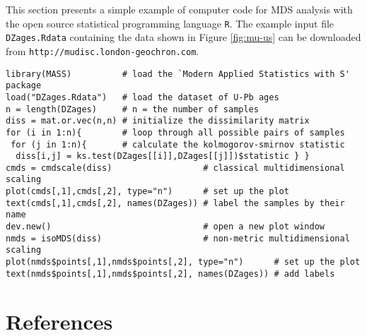 \documentclass[authoryear,preprint,review,12pt]{elsarticle}
\begin{document}
This section presents a simple example of computer code for MDS
analysis with the open source statistical programming language
\texttt{R}. The example input file \texttt{DZages.Rdata} containing
the data shown in Figure \ref{fig:mu-us} can be downloaded from
\texttt{http://mudisc.london-geochron.com}.

\begin{verbatim}
library(MASS)          # load the `Modern Applied Statistics with S' package
load("DZages.Rdata")   # load the dataset of U-Pb ages
n = length(DZages)     # n = the number of samples
diss = mat.or.vec(n,n) # initialize the dissimilarity matrix
for (i in 1:n){        # loop through all possible pairs of samples
 for (j in 1:n){       # calculate the kolmogorov-smirnov statistic
  diss[i,j] = ks.test(DZages[[i]],DZages[[j]])$statistic } }
cmds = cmdscale(diss)                  # classical multidimensional scaling
plot(cmds[,1],cmds[,2], type="n")      # set up the plot
text(cmds[,1],cmds[,2], names(DZages)) # label the samples by their name
dev.new()                              # open a new plot window
nmds = isoMDS(diss)                    # non-metric multidimensional scaling
plot(nmds$points[,1],nmds$points[,2], type="n")      # set up the plot
text(nmds$points[,1],nmds$points[,2], names(DZages)) # add labels
\end{verbatim}

\section*{References}
% 
%
\end{document}
